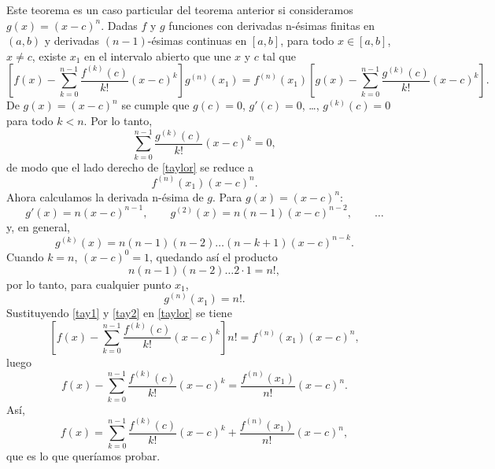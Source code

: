 \begin{prueba}
    Este teorema es un caso particular del teorema anterior si consideramos $g(x)=(x-c)^{n}$. Dadas $f$ y $g$ funciones con derivadas n-ésimas finitas en $(a,b)$ y derivadas $(n-1)$-ésimas continuas en $[a,b]$, para todo $x\in[a,b]$, $x\neq c$, existe $x_{1}$ en el intervalo abierto que une $x$ y $c$ tal que
    \begin{equation}\label{taylor}
    \left[ f(x)-\sum_{k=0}^{n-1}\frac{f^{(k)}(c)}{k!}(x-c)^{k} \right]g^{(n)}(x_{1})=f^{(n)}(x_{1})\left[ g(x)-\sum_{k=0}^{n-1}\frac{g^{(k)}(c)}{k!}(x-c)^{k} \right].
    \end{equation}
    De $g(x)=(x-c)^{n}$ se cumple que $g(c)=0$, $g'(c)=0$, \dots, $g^{(k)}(c)=0$ para todo $k<n$. Por lo tanto,
    \[
    \sum_{k=0}^{n-1}\frac{g^{(k)}(c)}{k!}(x-c)^{k}=0,
    \]
    de modo que el lado derecho de \eqref{taylor} se reduce a
    \begin{equation}\label{tay1}
    f^{(n)}(x_{1})(x-c)^{n}.
    \end{equation}
    Ahora calculamos la derivada n-ésima de $g$. Para $g(x)=(x-c)^{n}$:
    \[
    g'(x)=n(x-c)^{n-1},
    \qquad
    g^{(2)}(x)=n(n-1)(x-c)^{n-2},
    \qquad
    \dots
    \]
    y, en general,
    \[
    g^{(k)}(x)=n(n-1)(n-2)\dots(n-k+1)(x-c)^{n-k}.
    \]
    Cuando $k=n$, $(x-c)^{0}=1$, quedando así el producto
    \[
    n(n-1)(n-2)\dots 2\cdot 1 = n!,
    \]
    por lo tanto, para cualquier punto $x_{1}$,
    \begin{equation}\label{tay2}
    g^{(n)}(x_{1})=n!.
    \end{equation}
    Sustituyendo \eqref{tay1} y \eqref{tay2} en \eqref{taylor} se tiene
    \[
    \left[ f(x)-\sum_{k=0}^{n-1}\frac{f^{(k)}(c)}{k!}(x-c)^{k} \right]n! = f^{(n)}(x_{1})(x-c)^{n},
    \]
    luego
    \[
    f(x)-\sum_{k=0}^{n-1}\frac{f^{(k)}(c)}{k!}(x-c)^{k} =\frac{f^{(n)}(x_{1})}{n!}(x-c)^{n}.
    \]
    Así,
    \[
    f(x)=\sum_{k=0}^{n-1}\frac{f^{(k)}(c)}{k!}(x-c)^{k}+\frac{f^{(n)}(x_{1})}{n!}(x-c)^{n},
    \]
    que es lo que queríamos probar.
\end{prueba}
